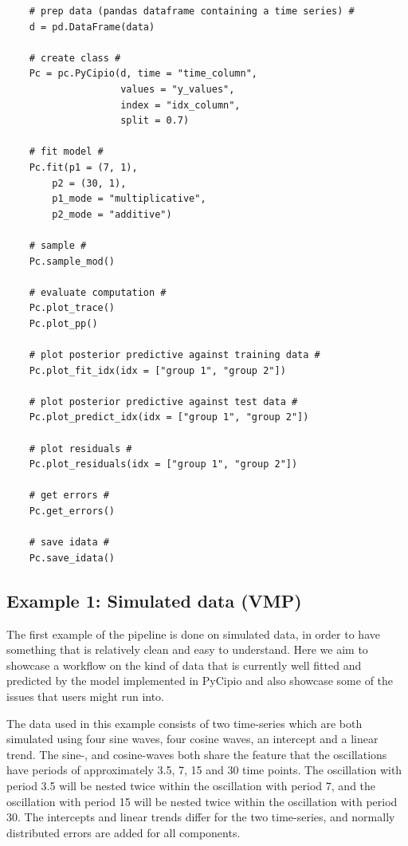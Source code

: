 \documentclass{article}
\begin{document}
\begin{lstlisting}
    # prep data (pandas dataframe containing a time series) #
    d = pd.DataFrame(data)
    
    # create class #
    Pc = pc.PyCipio(d, time = "time_column", 
                    values = "y_values", 
                    index = "idx_column", 
                    split = 0.7)
    
    # fit model #
    Pc.fit(p1 = (7, 1), 
        p2 = (30, 1), 
        p1_mode = "multiplicative", 
        p2_mode = "additive")
    
    # sample #
    Pc.sample_mod()
    
    # evaluate computation #
    Pc.plot_trace()
    Pc.plot_pp()
    
    # plot posterior predictive against training data #
    Pc.plot_fit_idx(idx = ["group 1", "group 2"])
    
    # plot posterior predictive against test data #
    Pc.plot_predict_idx(idx = ["group 1", "group 2"])
    
    # plot residuals #
    Pc.plot_residuals(idx = ["group 1", "group 2"])

    # get errors #
    Pc.get_errors()

    # save idata # 
    Pc.save_idata()
\end{lstlisting}


\subsection{Example 1: Simulated data (VMP)}

\noindent The first example of the pipeline is done on simulated data, in order to have something that is relatively clean and easy to understand. Here we aim to showcase a workflow on the kind of data that is currently well fitted and predicted by the model implemented in PyCipio and also showcase some of the issues that users might run into. 

\noindent The data used in this example consists of two time-series which are both simulated using four sine waves, four cosine waves, an intercept and a linear trend. The sine-, and cosine-waves both share the feature that the oscillations have periods of approximately 3.5, 7, 15 and 30 time points. The oscillation with period 3.5 will be nested twice within the oscillation with period 7, and the oscillation with period 15 will be nested twice within the oscillation with period 30. The intercepts and linear trends differ for the two time-series, and normally distributed errors are added for all components. 
\end{document}

